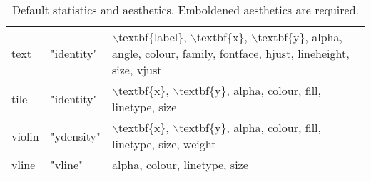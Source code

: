 \begin{table}[ht]
\begin{tabular}{lll}
  text & "identity" & $\backslash$textbf\{label\}, $\backslash$textbf\{x\}, $\backslash$textbf\{y\}, alpha, angle, colour, family, fontface, hjust, lineheight, size, vjust \\ 
  tile & "identity" & $\backslash$textbf\{x\}, $\backslash$textbf\{y\}, alpha, colour, fill, linetype, size \\ 
  violin & "ydensity" & $\backslash$textbf\{x\}, $\backslash$textbf\{y\}, alpha, colour, fill, linetype, size, weight \\ 
  vline & "vline" & alpha, colour, linetype, size \\ 
   \hline
\end{tabular}
\caption{Default statistics and aesthetics. 
             Emboldened aesthetics are required.} 
\label{geom-aesthetics}
\end{table}
